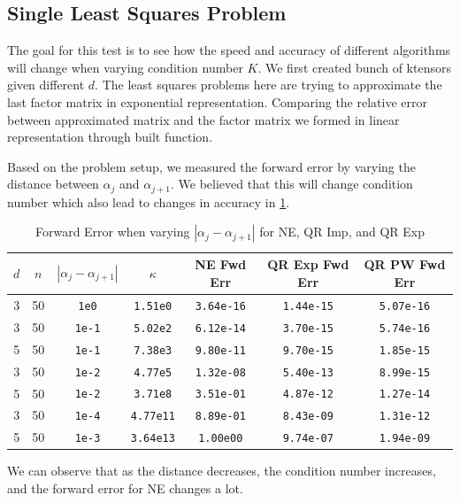 \documentclass{article}
\newcommand{\T}[2][]{#1{\mathbf{\cal{#2}}}} 						%
\begin{document}
\subsection{Single Least Squares Problem}


The goal for this test is to see how the speed and accuracy of different algorithms will change when varying condition number $K$.
We first created bunch of ktensors given different $d$. The least squares problems here are trying to approximate the last factor matrix in exponential representation. Comparing the relative error between approximated matrix and the factor matrix we formed in linear representation through built function. 

Based on the problem setup, we measured the forward error by varying the distance between $\alpha_j$ and $\alpha_{j+1}$.
We believed that this will change condition number which also lead to changes in accuracy in \cref{tab:LS_err}. 

\begin{table}[ht!] 
  \centering
  \begin{tabular}{|c|c|c|c|c|c|c|}
    \hline
    $d$ & $n$ & $|\alpha_j-\alpha_{j+1}|$ & $\kappa$ & NE Fwd Err & QR Exp Fwd Err & QR PW Fwd Err \\
    \hline
    3 & 50 & \texttt{1e0}  & \texttt{1.51e0}  & \texttt{3.64e-16} & \texttt{1.44e-15} & \texttt{5.07e-16} \\
    3 & 50 & \texttt{1e-1} & \texttt{5.02e2}  & \texttt{6.12e-14} & \texttt{3.70e-15} & \texttt{5.74e-16} \\
    5 & 50 & \texttt{1e-1} & \texttt{7.38e3}  & \texttt{9.80e-11} & \texttt{9.70e-15} & \texttt{1.85e-15}\\
    3 & 50 & \texttt{1e-2} & \texttt{4.77e5}  & \texttt{1.32e-08} & \texttt{5.40e-13} & \texttt{8.99e-15} \\
    5 & 50 & \texttt{1e-2} & \texttt{3.71e8}  & \texttt{3.51e-01} & \texttt{4.87e-12} & \texttt{1.27e-14}\\
    3 & 50 & \texttt{1e-4} & \texttt{4.77e11} & \texttt{8.89e-01} & \texttt{8.43e-09} & \texttt{1.31e-12} \\
    5 & 50 & \texttt{1e-3} & \texttt{3.64e13} & \texttt{1.00e00}  & \texttt{9.74e-07} & \texttt{1.94e-09}\\
    \hline
  \end{tabular}
  \caption{Forward Error when varying $|\alpha_j-\alpha_{j+1}|$ for NE, QR Imp, and QR Exp}
  \label{tab:LS_err}
\end{table}
We can observe that as the distance decreases, the condition number increases, and the forward error for NE changes a lot.
\end{document}

